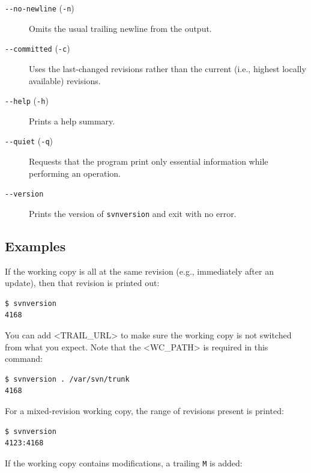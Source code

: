 \begin{description}
\item[\protect{}\label{svn.ref.svnversion.sw.no_newline}{}\texttt{-\/-no-newline}
(\texttt{-n})]
Omits the usual trailing newline from the output.
\item[\protect{}\label{svn.ref.svnversion.sw.committed}{}\texttt{-\/-committed}
(\texttt{-c})]
Uses the last-changed revisions rather than the current (i.e., highest
locally available) revisions.
\item[\protect{}\label{svn.ref.svnversion.sw.help}{}\texttt{-\/-help}
(\texttt{-h})]
Prints a help summary.
\item[\protect{}\label{svn.ref.svnversion.sw.quiet}{}\texttt{-\/-quiet}
(\texttt{-q})]
Requests that the program print only essential information while
performing an operation.
\item[\protect{}\label{svn.ref.svnversion.sw.version}{}\texttt{-\/-version}]
Prints the version of \texttt{svnversion} and exit with no error.
\end{description}

\subsection{Examples}\label{svn.ref.svnversion.re.examples}

If the working copy is all at the same revision (e.g., immediately after
an update), then that revision is printed out:

\begin{verbatim}
$ svnversion
4168
\end{verbatim}

You can add \textless TRAIL\_URL\textgreater{} to make sure the working
copy is not switched from what you expect. Note that the
\textless WC\_PATH\textgreater{} is required in this command:

\begin{verbatim}
$ svnversion . /var/svn/trunk
4168
\end{verbatim}

For a mixed-revision working copy, the range of revisions present is
printed:

\begin{verbatim}
$ svnversion
4123:4168
\end{verbatim}

If the working copy contains modifications, a trailing
\textquotesingle{}\texttt{M}\textquotesingle{} is added:

